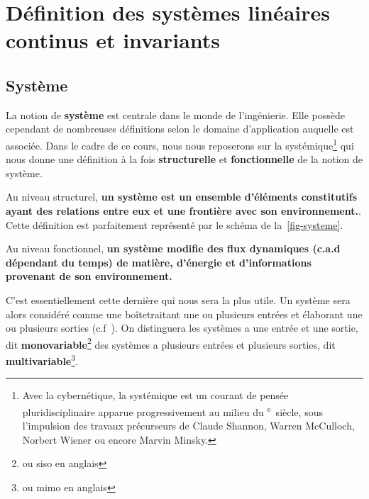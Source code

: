 \newpage
\section[Définition SLCI]{Définition des systèmes linéaires continus et invariants}

\subsection{Système}
La notion de \textbf{système} est centrale dans le monde de l'ingénierie.
Elle possède cependant de nombreuses définitions selon le domaine 
d'application auquelle est associée. Dans le cadre de ce cours, nous nous 
reposerons sur la systémique\footnote{Avec la cybernétique, la systémique est un 
courant de pensée pluridisciplinaire apparue progressivement au milieu du 
\textsc{}\textsuperscript{e}~siècle, sous l'impulsion des travaux 
précurseurs de Claude Shannon, 
Warren McCulloch, Norbert Wiener 
ou encore Marvin Minsky.} 
qui nous donne une définition à la fois \textbf{structurelle} et \textbf{fonctionnelle} 
de la notion de système.

Au niveau structurel, \textbf{un système est un ensemble 
d'éléments constitutifs ayant des relations entre eux et 
une frontière avec son environnement.}. Cette définition est parfaitement
représenté par le schéma de la~\cref{fig-systeme}.

Au niveau fonctionnel, \textbf{un système modifie des flux dynamiques (c.a.d dépendant
du temps) de matière, d'énergie et d'informations provenant de son environnement.}

C'est essentiellement cette dernière qui nous sera la plus utile.
Un système sera alors considéré comme 
une \og boîte\fg traitant une ou plusieurs entrées et élaborant une ou plusieurs
sorties (c.f~). On distinguera les systèmes a une entrée et une 
sortie, dit \textbf{monovariable}\footnote{ou \gls{siso} en anglais}
des systèmes  a plusieurs entrées et plusieurs sorties, dit 
\textbf{multivariable}\footnote{ou \gls{mimo} en anglais}.

